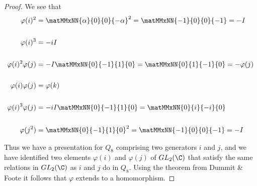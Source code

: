 \begin{proof}
  We see that
  \begin{align*}
    \varphi(i)^2 &= \matMMxNN{\alpha}{0}
                      {0}{-\alpha}^2 = \matMMxNN{-1}{0}
                                           {0}{-1} = -I \\
~\\
    \varphi(i)^3 &= -iI \\
~\\
    \varphi(i)^2\varphi(j) &= -I \matMMxNN{0}{-1}
                             {1}{0} = \matMMxNN{0}{1}
                                               {-1}{0} = -\varphi(j) \\
~\\
    \varphi(i)\varphi(j) &= \varphi(k) \\
~\\
    \varphi(i)^3\varphi(j) &= -iI\matMMxNN{0}{-1}
                              {1}{0} = \matMMxNN{0}{i}
                                                 {-i}{0}\\
~\\
    \varphi(j^2) &= \matMMxNN{0}{-1}
                      {1}{0}^2 = \matMMxNN{-1}{0}
                                          {0}{-1} = -I \\
  \end{align*}

  Thus we have a presentation for $Q_8$ comprising two generators $i$ and $j$, and we have
  identified two elements $\varphi(i)$ and $\varphi(j)$ of $GL_2(\C)$ that satisfy the same relations
  in $GL_2(\C)$ as $i$ and $j$ do in $Q_8$. Using the theorem from Dummit \& Foote it follows
  that $\varphi$ extends to a homomorphism.


\end{proof}
